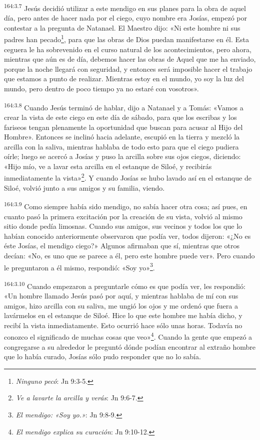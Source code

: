 \par 
\textsuperscript{164:3.7} Jesús decidió utilizar a este mendigo en sus planes para la obra de aquel día, pero antes de hacer nada por el ciego, cuyo nombre era Josías, empezó por contestar a la pregunta de Natanael. El Maestro dijo: «Ni este hombre ni sus padres han pecado\footnote{\textit{Ninguno pecó}: Jn 9:3-5.}, para que las obras de Dios puedan manifestarse en él. Esta ceguera le ha sobrevenido en el curso natural de los acontecimientos, pero ahora, mientras que aún es de día, debemos hacer las obras de Aquel que me ha enviado, porque la noche llegará con seguridad, y entonces será imposible hacer el trabajo que estamos a punto de realizar. Mientras estoy en el mundo, yo soy la luz del mundo, pero dentro de poco tiempo ya no estaré con vosotros».

\par 
\textsuperscript{164:3.8} Cuando Jesús terminó de hablar, dijo a Natanael y a Tomás: «Vamos a crear la vista de este ciego en este día de sábado, para que los escribas y los fariseos tengan plenamente la oportunidad que buscan para acusar al Hijo del Hombre». Entonces se inclinó hacia adelante, escupió en la tierra y mezcló la arcilla con la saliva, mientras hablaba de todo esto para que el ciego pudiera oírle; luego se acercó a Josías y puso la arcilla sobre sus ojos ciegos, diciendo: «Hijo mío, ve a lavar esta arcilla en el estanque de Siloé, y recibirás inmediatamente la vista»\footnote{\textit{Ve a lavarte la arcilla y verás}: Jn 9:6-7.}. Y cuando Josías se hubo lavado así en el estanque de Siloé, volvió junto a sus amigos y su familia, viendo.

\par 
\textsuperscript{164:3.9} Como siempre había sido mendigo, no sabía hacer otra cosa; así pues, en cuanto pasó la primera excitación por la creación de su vista, volvió al mismo sitio donde pedía limosnas. Cuando sus amigos, sus vecinos y todos los que lo habían conocido anteriormente observaron que podía ver, todos dijeron: «¿No es éste Josías, el mendigo ciego?» Algunos afirmaban que sí, mientras que otros decían: «No, es uno que se parece a él, pero este hombre puede ver». Pero cuando le preguntaron a él mismo, respondió: «Soy yo»\footnote{\textit{El mendigo: «Soy yo.»}: Jn 9:8-9.}.

\par 
\textsuperscript{164:3.10} Cuando empezaron a preguntarle cómo es que podía ver, les respondió: «Un hombre llamado Jesús pasó por aquí, y mientras hablaba de mí con sus amigos, hizo arcilla con su saliva, me ungió los ojos y me ordenó que fuera a lavármelos en el estanque de Siloé. Hice lo que este hombre me había dicho, y recibí la vista inmediatamente. Esto ocurrió hace sólo unas horas. Todavía no conozco el significado de muchas cosas que veo»\footnote{\textit{El mendigo explica su curación}: Jn 9:10-12.}. Cuando la gente que empezó a congregarse a su alrededor le preguntó dónde podían encontrar al extraño hombre que lo había curado, Josías sólo pudo responder que no lo sabía.


